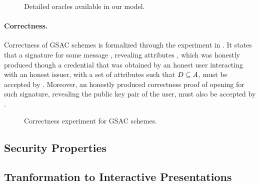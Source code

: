 {\begin{figure*}[htp!]
{\begin{minipage}[t]{.5\textwidth}
      \end{minipage}
      
    }

    \caption{Detailed oracles available in our model.}
    \label{fig:oracles}
  \end{figure*}
}

\paragraph{Correctness.} %
Correctness of GSAC schemes is formalized through the experiment in
. It states that a signature for some message \msg,
revealing attributes \DAttrs, which was honestly produced though a credential
that was obtained by an honest user interacting with an honest issuer, with a
set of attributes \Attrs such that $D \subseteq A$, must be accepted
by \Verify. Moreover, an honestly produced correctness proof of opening for such
signature, revealing the public key pair of the user, must also be accepted by
\Judge.

\begin{figure}[htp!]
  \caption{Correctness experiment for GSAC schemes.}
  \label{fig:exp-gsac-corr}
  \end{figure}

\subsection{Security Properties}
\label{ssec:security}

\subsection{Tranformation to Interactive Presentations}
\label{ssec:interactivetransform}

